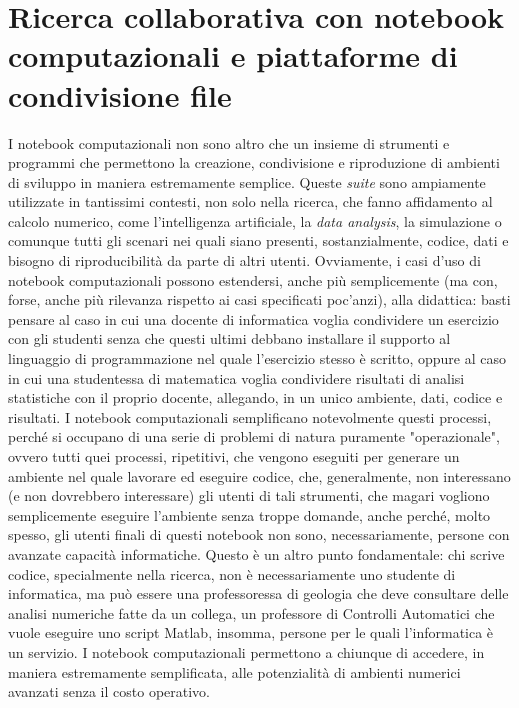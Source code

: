 \chapter{Ricerca collaborativa con notebook computazionali e piattaforme di condivisione file}
I notebook computazionali non sono altro che un insieme di strumenti e programmi che permettono la creazione, condivisione e riproduzione di ambienti di sviluppo in maniera estremamente semplice. Queste \textit{suite} sono ampiamente utilizzate in tantissimi contesti, non solo nella ricerca, che fanno affidamento al calcolo numerico, come l'intelligenza artificiale, la \textit{data analysis}, la simulazione o comunque tutti gli scenari nei quali siano presenti, sostanzialmente, codice, dati e bisogno di riproducibilità da parte di altri utenti.
\newline
Ovviamente, i casi d'uso di notebook computazionali possono estendersi, anche più semplicemente (ma con, forse, anche più rilevanza rispetto ai casi specificati poc'anzi), alla didattica: basti pensare al caso in cui una docente di informatica voglia condividere un esercizio con gli studenti senza che questi ultimi debbano installare il supporto al linguaggio di programmazione nel quale l'esercizio stesso è scritto, oppure al caso in cui una studentessa di matematica voglia condividere risultati di analisi statistiche con il proprio docente, allegando, in un unico ambiente, dati, codice e risultati.
\newline
I notebook computazionali semplificano notevolmente questi processi, perché si occupano di una serie di problemi di natura puramente "operazionale", ovvero tutti quei processi, ripetitivi, che vengono eseguiti per generare un ambiente nel quale lavorare ed eseguire codice, che, generalmente, non interessano (e non dovrebbero interessare) gli utenti di tali strumenti, che magari vogliono semplicemente eseguire l'ambiente senza troppe domande, anche perché, molto spesso, gli utenti finali di questi notebook non sono, necessariamente, persone con avanzate capacità informatiche. Questo è un altro punto fondamentale: chi scrive codice, specialmente nella ricerca, non è necessariamente uno studente di informatica, ma può essere una professoressa di geologia che deve consultare delle analisi numeriche fatte da un collega, un professore di Controlli Automatici che vuole eseguire uno script Matlab, insomma, persone per le quali l'informatica è un servizio. I notebook computazionali permettono a chiunque di accedere, in maniera estremamente semplificata, alle potenzialità di ambienti numerici avanzati senza il costo operativo.
\newline
